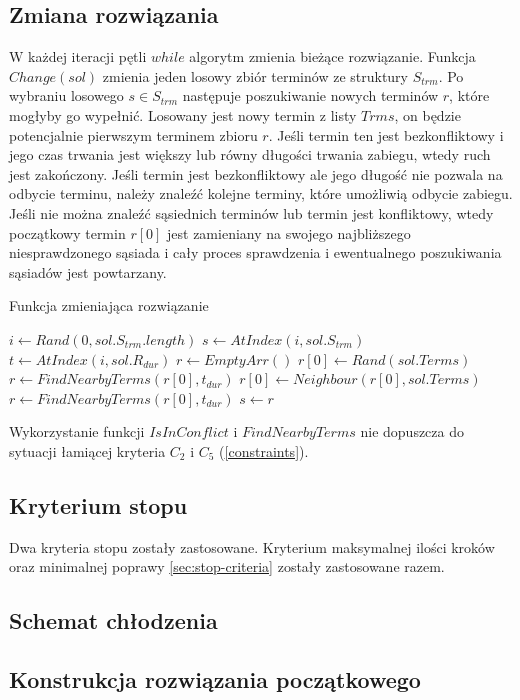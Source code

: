 \subsection{Zmiana rozwiązania}
W każdej iteracji pętli $while$ algorytm zmienia bieżące rozwiązanie. Funkcja
$Change(sol)$ zmienia jeden losowy zbiór terminów ze struktury $S_{trm}$.
Po wybraniu losowego $s \in S_{trm}$ następuje poszukiwanie nowych terminów $r$,
które mogłyby go wypełnić. Losowany jest nowy termin z listy $Trms$, on będzie
potencjalnie pierwszym terminem zbioru $r$. Jeśli termin ten jest bezkonfliktowy
i jego czas trwania jest większy lub równy długości trwania zabiegu, wtedy ruch
jest zakończony. Jeśli termin jest bezkonfliktowy ale jego długość nie pozwala
na odbycie terminu, należy znaleźć kolejne terminy, które umożliwią odbycie
zabiegu. Jeśli nie można znaleźć sąsiednich terminów lub termin jest
konfliktowy, wtedy początkowy termin $r[0]$ jest zamieniany na swojego
najbliższego niesprawdzonego sąsiada i cały proces sprawdzenia i ewentualnego
poszukiwania sąsiadów jest powtarzany.

\begin{algorithm}
	\caption{Funkcja zmieniająca rozwiązanie}\label{fn-change}
\begin{algorithmic}[1]
\State $i \gets Rand(0,sol.S_{trm}.length)$
\State $s \gets AtIndex(i,sol.S_{trm})$
\State $t \gets AtIndex(i,sol.R_{dur})$
\State $r \gets EmptyArr()$
\State $r[0] \gets Rand(sol.Terms)$
\State $r \gets FindNearbyTerms(r[0], t_{dur})$
\State $r[0] \gets Neighbour(r[0],sol.Terms)$
\State $r \gets FindNearbyTerms(r[0], t_{dur})$
\EndWhile
\State $s \gets r$
\EndProcedure
\end{algorithmic}
\end{algorithm}
Wykorzystanie funkcji $IsInConflict$ i $FindNearbyTerms$ nie dopuszcza do sytuacji łamiącej
kryteria $C_2$ i $C_5$ (\ref{constraints}).

\subsection{Kryterium stopu}
Dwa kryteria stopu zostały zastosowane. Kryterium maksymalnej ilości kroków oraz
minimalnej poprawy \ref{sec:stop-criteria} zostały zastosowane razem.

\subsection{Schemat chłodzenia}
\subsection{Konstrukcja rozwiązania początkowego}

